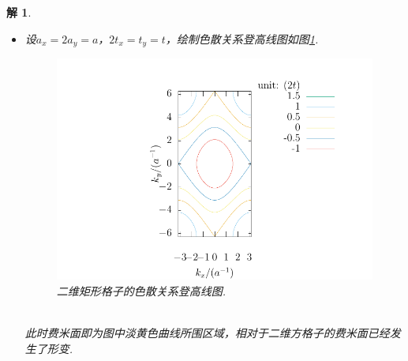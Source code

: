 \documentclass[UTF8,10pt,a4paper]{article}
\theoremstyle{Problem}
\theoremstyle{Solution}
\newtheorem*{sol}{解}
\begin{document}
\begin{sol}
\begin{enumerate}
\begin{itemize}
            将猜测的解代入薛定谔方程中，得色散关系
            \begin{align}
                E(\bm{k})=\varepsilon_0-2[t_x\cos(k_xa_x)+t_y\cos(k_ya_y)].
            \end{align}
            \item[$\triangleright$] 设$a_x=2a_y=a$，$2t_x=t_y=t$，绘制色散关系登高线图如图\ref{2-E-k-rectangular}.
            \begin{figure}[h]
                \centering
                \includegraphics[width=.6\textwidth]{2-E-k-rectangular.pdf}
                \caption{二维矩形格子的色散关系登高线图.}
                \label{2-E-k-rectangular}
            \end{figure}
            \\此时费米面即为图中淡黄色曲线所围区域，相对于二维方格子的费米面已经发生了形变.
        \end{itemize}
    \end{enumerate}
\end{sol}
\end{document}
